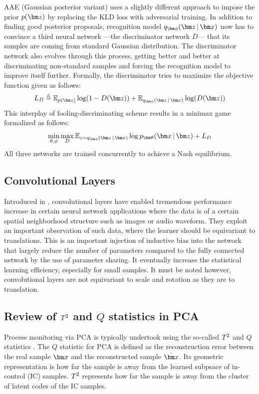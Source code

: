 \documentclass{scrartcl}
\theoremstyle{definition}
\begin{document}
AAE (Gaussian posterior variant) \parencite{Makhzani2015-ei} uses a slightly different approach to impose the prior $\pz$ by replacing the KLD loss with adversarial training. 
In addition to finding good posterior proposals, recognition model $\encoding$ now has to convince a third neural network ---the discriminator network $D$--- that its samples are coming from standard Gaussian distribution.
The discriminator network also evolves through this process, getting better and better at discriminating non-standard samples and forcing the recognition model to improve itself further.
Formally, the discriminator tries to maximize the objective function given as follows:
\begin{equation}
\label{eqn:discloss}
	 L_{D} \triangleq  \E_{\pz} \log(1 - D(\mbz)) +  \E_{\encoding} \log(D(\mbz))
\end{equation}
This interplay of fooling-discriminating scheme results in a minimax game formalized as follows:
\begin{equation}
\label{eqn:aae-loss}
	\min_{\theta,\phi}\max_{D} \E_{z \sim \encoding}\log\decoding + L_{D}
\end{equation}
All three networks are trained concurrently to achieve a Nash equilibrium.

\subsection{Convolutional Layers}
Introduced in \parencite{lecun1989backpropagation}, convolutional layers have enabled tremendous performance increase in certain neural network applications where the data is of a certain spatial neighborhood structure such as images or audio waveform.
They exploit an important observation of such data, where the learner should be equivariant to translations.
This is an important injection of inductive bias into the network that largely reduce the number of parameters compared to the fully connected network by the use of parameter sharing. It eventually increase the statistical learning efficiency, especially for small samples.
It must be noted however, convolutional layers are not equivariant to scale and rotation as they are to translation.

\subsection{Review of $T^{2} $ and $Q$ statistics in PCA}
\label{sec:bckgrnd:ReviewPCA}
Process monitoring via PCA is typically undertook using the so-called $ T^{2} $ and $ Q $ statistics \parencite{Chen2004-px}. 
The $ Q $ statistic for PCA is defined as the reconstruction error between the real sample $ \mbx $ and the reconstructed sample $ \tilde{\mbx} $. Its geometric representation is how far the sample is away from the learned subpsace of in-control (IC) samples.  $ T^{2} $ represents how far the sample is away from the cluster of latent codes of the IC samples. 
\end{document}
